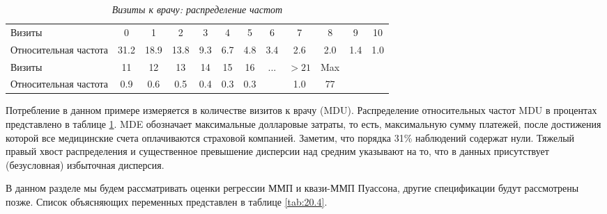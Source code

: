     \begin{table}[!htbp]\caption{\textit{Визиты к врачу: распределение частот}}\label{tab:20.3}
    \begin{center}
\begin{tabular}{lccccccccccc}
\hline \hline
Визиты                  &0&1&2&3&4&5&6&7&8&9&10\\
Относительная частота   &31.2&18.9&13.8&9.3&6.7&4.8&3.4&2.6&2.0&1.4&1.0\\
\hline
Визиты                  &11&12&13&14&15&16&...&$>21$& Max&&\\
Относительная частота   &0.9&0.6&0.5&0.4&0.3&0.3& &1.0&77&&\\
\hline \hline
\end{tabular}
    \end{center}
    \end{table}

Потребление в данном примере измеряется в количестве визитов к врачу (MDU). Распределение относительных частот MDU в процентах представлено в таблице \ref{tab:20.3}. MDE обозначает максимальные долларовые затраты, то есть, максимальную сумму платежей, после достижения которой все медицинские счета оплачиваются страховой компанией. Заметим, что порядка 31\% наблюдений содержат нули. Тяжелый правый хвост распределения и существенное превышение дисперсии над средним указывают на то, что в данных присутствует (безусловная) избыточная дисперсия.

В данном разделе мы будем рассматривать оценки регрессии ММП и квази-ММП Пуассона, другие спецификации будут рассмотрены позже. Список объясняющих переменных представлен в таблице \ref{tab:20.4}.

